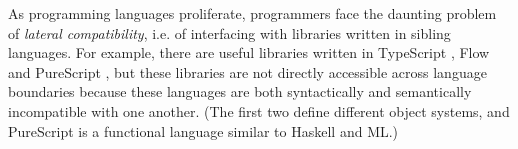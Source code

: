 \documentclass[10pt]{sigplanconf}
\begin{document}


%



As programming languages proliferate, programmers face the daunting problem of \emph{lateral compatibility}, i.e. of interfacing with libraries written in sibling languages. For example, there are useful libraries written in TypeScript \cite{bierman2014understanding}, Flow \cite{Flow} and PureScript \cite{PureScript}, but these libraries are not directly accessible across language boundaries because these languages are both syntactically and semantically incompatible with one another. (The first two define different object systems, and PureScript is a functional language similar to Haskell and ML.) 
\end{document}
